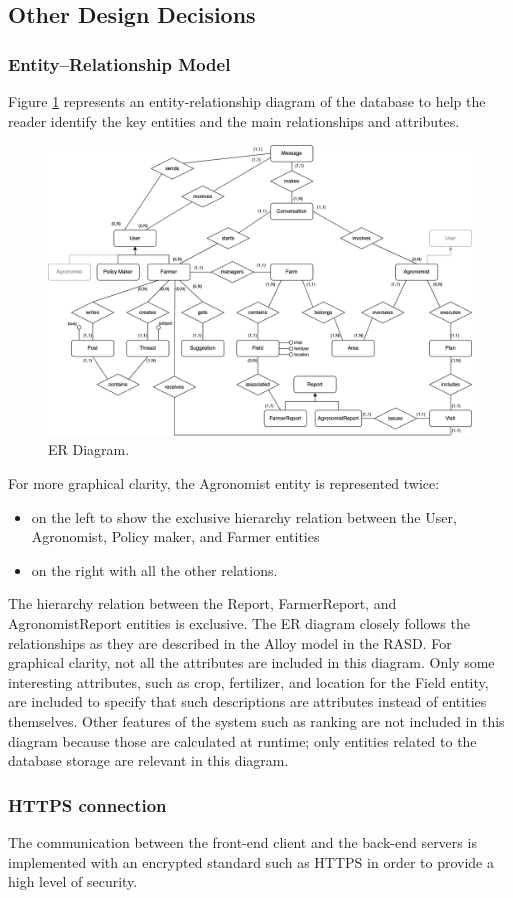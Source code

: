\subsection{Other Design Decisions}

\subsubsection{Entity–Relationship Model}
\noindent
Figure \ref{fig:ERDiagram} represents an entity-relationship diagram of the database to help the reader identify the key entities and the main relationships and attributes.

\begin{figure}[hbt!]
\centering
\includegraphics[width=\textwidth]{../images_diagrams/dd/er_diagram.png}
\caption{ER Diagram.}
\label{fig:ERDiagram}
\end{figure}

\noindent
For more graphical clarity, the Agronomist entity is represented twice:
\begin{itemize}
	\item on the left to show the exclusive hierarchy relation between the User, Agronomist, Policy maker, and Farmer entities
	\item on the right with all the other relations. 
\end{itemize}

\noindent
The hierarchy relation between the Report, FarmerReport, and AgronomistReport entities is exclusive. The ER diagram closely follows the relationships as they are described in the Alloy model in the RASD. For graphical clarity, not all the attributes are included in this diagram. Only some interesting attributes, such as crop, fertilizer, and location for the Field entity, are included to specify that such descriptions are attributes instead of entities themselves. Other features of the system such as ranking are not included in this diagram because those are calculated at runtime; only entities related to the database storage are relevant in this diagram.

\subsubsection{HTTPS connection}
\noindent
The communication between the front-end client and the back-end servers is implemented with an encrypted standard such as HTTPS in order to provide a high level of security.
